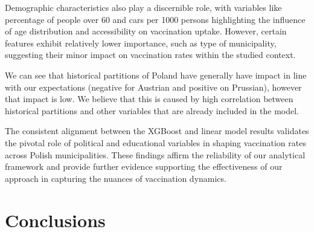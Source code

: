\documentclass[a4paper,12pt]{article} %
\begin{document}
  Demographic characteristics also play a discernible role, with variables like percentage of people over 60 and cars per 1000 persons highlighting the influence of age distribution and accessibility on vaccination uptake. However, certain features exhibit relatively lower importance, such as type of municipality, suggesting their minor impact on vaccination rates within the studied context.

We can see that historical partitions of Poland have generally have impact in line with our expectations (negative for Austrian and positive on Prussian), however that impact is low. We believe that this is caused by high correlation between historical partitions and other variables that are already included in the model. 

The consistent alignment between the XGBoost and linear model results validates the pivotal role of political and educational variables in shaping vaccination rates across Polish municipalities. These findings affirm the reliability of our analytical framework and provide further evidence supporting the effectiveness of our approach in capturing the nuances of vaccination dynamics.


\newpage
\section{Conclusions}
\end{document}
